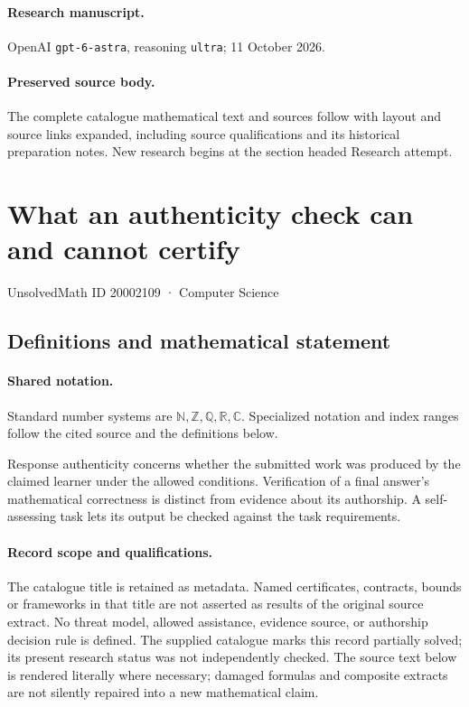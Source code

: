\documentclass[11pt]{article}
\begin{document}
\paragraph{Research manuscript.} OpenAI \texttt{gpt-6-astra}, reasoning \texttt{ultra}; 11 October 2026.
\paragraph{Preserved source body.} The complete catalogue mathematical text and sources follow with layout and source links expanded, including source qualifications and its historical preparation notes. New research begins at the section headed Research attempt.

\section{What an authenticity check can and cannot certify}\label{20002109}
{\small UnsolvedMath ID 20002109 · Computer Science}
\subsection{Definitions and mathematical statement}

\paragraph{Shared notation.}Standard number systems are $\mathbb N,\mathbb Z,\mathbb Q,\mathbb R,\mathbb C$. Specialized notation and index ranges follow the cited source and the definitions below.


Response authenticity concerns whether the submitted work was produced by the claimed learner under the allowed conditions. Verification of a final answer's mathematical correctness is distinct from evidence about its authorship. A self-assessing task lets its output be checked against the task requirements.
\paragraph{Record scope and qualifications.}
The catalogue title is retained as metadata. Named certificates, contracts, bounds or frameworks in that title are not asserted as results of the original source extract.
No threat model, allowed assistance, evidence source, or authorship decision rule is defined. The supplied catalogue marks this record partially solved; its present research status was not independently checked.
The source text below is rendered literally where necessary; damaged formulas and composite extracts are not silently repaired into a new mathematical claim.
\end{document}
